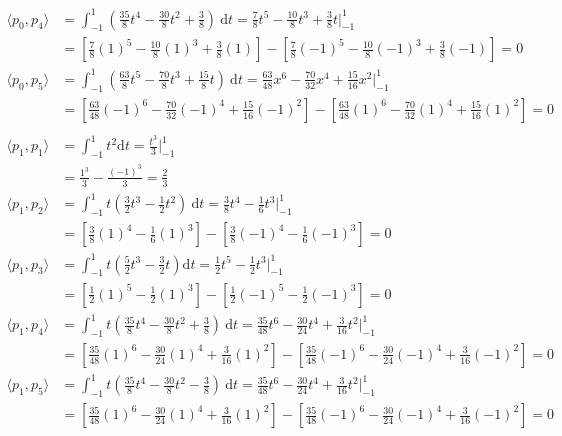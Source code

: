 \begin{align*}
\langle p_0,p_4 \rangle &= \int_{-1}^{1}\left(\frac{35}{8}t^4-\frac{30}{8}t^2+\frac{3}{8}\right)\:\mathrm{d}t = \frac{7}{8}t^5-\frac{10}{8}t^3+\frac{3}{8}t \Big|_{-1}^{1}\\ &= \left[\frac{7}{8}(1)^5-\frac{10}{8}(1)^3+\frac{3}{8}(1)\right] - \left[\frac{7}{8}(-1)^5-\frac{10}{8}(-1)^3+\frac{3}{8}(-1)\right] = \boxed{0}\\
\langle p_0,p_5 \rangle &= \int_{-1}^{1} \left(\frac{63}{8}t^5-\frac{70}{8}t^3+\frac{15}{8}t\right)\:\mathrm{d}t = \frac{63}{48}x^6-\frac{70}{32}x^4+\frac{15}{16}x^2 \Big|_{-1}^{1} \\ &= \left[\frac{63}{48}(-1)^6-\frac{70}{32}(-1)^4+\frac{15}{16}(-1)^2\right] - \left[\frac{63}{48}(1)^6-\frac{70}{32}(1)^4+\frac{15}{16}(1)^2\right] = \boxed{0}\\
\end{align*}
\begin{align*}
\langle p_1, p_1 \rangle &= \int_{-1}^{1} t^2 \mathrm{d}t = \frac{t^3}{3} \Big|_{-1}^{1} \\ &= \frac{1^3}{3}-\frac{(-1)^3}{3} = \boxed{\frac{2}{3}}\\
\langle p_1, p_2 \rangle &= \int_{-1}^{1} t\left(\frac{3}{2}t^3-\frac{1}{2}t^2\right)\:\mathrm{d}t = \frac{3}{8}t^4 - \frac{1}{6}t^3 \Big|_{-1}^{1} \\ &= \left[\frac{3}{8}(1)^4 - \frac{1}{6}(1)^3\right] - \left[\frac{3}{8}(-1)^4 - \frac{1}{6}(-1)^3\right] = \boxed{0} \\
\langle p_1, p_3 \rangle &= \int_{-1}^{1} t\left(\frac{5}{2}t^3-\frac{3}{2}t\right) \mathrm{d}t = \frac{1}{2}t^5-\frac{1}{2}t^3 \Big|_{-1}^{1} \\ &= \left[
\frac{1}{2}(1)^5-\frac{1}{2}(1)^3\right] - \left[\frac{1}{2}(-1)^5-\frac{1}{2}(-1)^3\right] = \boxed{0}\\
\langle p_1, p_4 \rangle &= \int_{-1}^{1}t\left(\frac{35}{8}t^4-\frac{30}{8}t^2+\frac{3}{8}\right)\:\mathrm{d}t = \frac{35}{48}t^6-\frac{30}{24}t^4 + \frac{3}{16}t^2 \Big|_{-1}^{1}\\ &= \left[\frac{35}{48}(1)^6-\frac{30}{24}(1)^4 + \frac{3}{16}(1)^2\right] - \left[\frac{35}{48}(-1)^6-\frac{30}{24}(-1)^4 + \frac{3}{16}(-1)^2\right] = \boxed{0}\\
\langle p_1, p_5 \rangle &= \int_{-1}^{1}t\left(\frac{35}{8}t^4-\frac{30}{8}t^2-\frac{3}{8}\right)\:\mathrm{d}t = \frac{35}{48}t^6-\frac{30}{24}t^4+\frac{3}{16}t^2\Big|_{-1}^{1}\\ &= \left[\frac{35}{48}(1)^6-\frac{30}{24}(1)^4+\frac{3}{16}(1)^2\right] - \left[\frac{35}{48}(-1)^6-\frac{30}{24}(-1)^4+\frac{3}{16}(-1)^2\right] = \boxed{0}
\end{align*}
